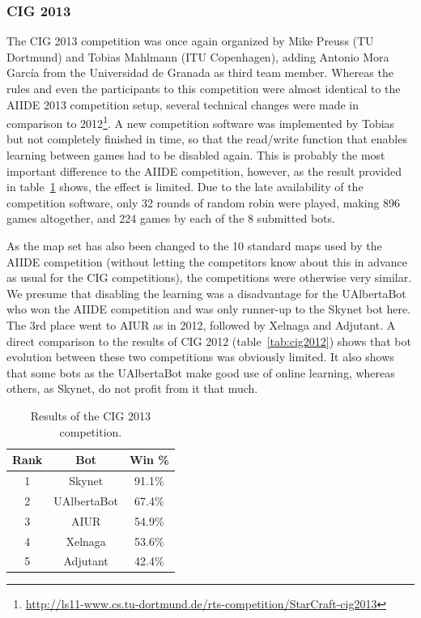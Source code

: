 \documentclass{llncs}
\begin{document}
\subsubsection{CIG 2013} The CIG 2013 competition was once again
organized by Mike Preuss (TU Dortmund) and Tobias Mahlmann (ITU Copenhagen),
adding Antonio Mora Garc{\'i}a from the Universidad de Granada as
third team member. Whereas the rules and even the participants
to this competition were almost identical to the AIIDE 2013
competition setup, several technical changes were made in comparison
to 2012\footnote{\url{http://ls11-www.cs.tu-dortmund.de/rts-competition/StarCraft-cig2013}}.
A new competition software was implemented by Tobias but
not completely finished in time, so that the read/write function
that enables learning between games had to be disabled again. 
This is probably the most important difference to the AIIDE competition,
however, as the result provided in table~\ref{tab:cig2013} shows, the effect is
limited. Due to the late availability of the competition software,
only 32 rounds of random robin were played, making 896 games
altogether, and 224 games by each of the 8 submitted bots. 

As the map set has also been changed to the 10 standard
maps used by the AIIDE competition (without letting the competitors
know about this in advance as usual for the CIG competitions), 
the competitions were otherwise very similar. We presume that 
disabling the learning was a disadvantage for the UAlbertaBot who
won the AIIDE competition and was only runner-up to the Skynet bot
here. The 3rd place went to AIUR as in 2012, followed by 
Xelnaga and Adjutant. A direct comparison to the results of
CIG 2012 (table~\ref{tab:cig2012}) shows that bot evolution 
between these two competitions was obviously limited. It also
shows that some bots as the UAlbertaBot make good use of 
online learning, whereas others, as Skynet, do not profit from
it that much.




\begin{table}[t]
\caption{Results of the CIG 2013 competition.}
\label{tab:cig2013}
\centering
\begin{tabular}{|c|c|c|}
\hline
{\bfseries Rank} & {\bfseries Bot} & {\bfseries Win \%} \\
\hline
1 & Skynet & 91.1\% \\
2 & UAlbertaBot & 67.4\% \\
3 & AIUR & 54.9\% \\
4 & Xelnaga & 53.6\% \\
5 & Adjutant & 42.4\% \\ 
\hline
\end{tabular}
\end{table}
\end{document}
